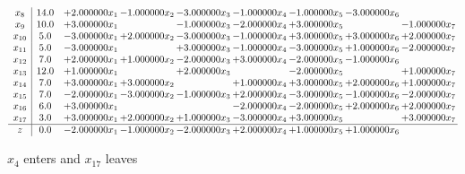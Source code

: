 \documentclass[10pt]{article}
\begin{document}
\[\begin{array}{c| c c@{\hskip 2pt} c@{\hskip 2pt} c@{\hskip 2pt} c@{\hskip 2pt} c@{\hskip 2pt} c@{\hskip 2pt} c@{\hskip 2pt} }
 x_{8}   &  14.0 & + 2.000000 x_{1} & -1.000000 x_{2} & -3.000000 x_{3} & -1.000000 x_{4} & -1.000000 x_{5} & -3.000000 x_{6} &   \\
 x_{9}   &  10.0 & + 3.000000 x_{1} &   & -1.000000 x_{3} & -2.000000 x_{4} & + 3.000000 x_{5} &   & -1.000000 x_{7}\\
 x_{10}   &  5.0 & -3.000000 x_{1} & + 2.000000 x_{2} & -3.000000 x_{3} & -1.000000 x_{4} & + 3.000000 x_{5} & + 3.000000 x_{6} & + 2.000000 x_{7}\\
 x_{11}   &  5.0 & -3.000000 x_{1} &   & + 3.000000 x_{3} & -1.000000 x_{4} & -3.000000 x_{5} & + 1.000000 x_{6} & -2.000000 x_{7}\\
 x_{12}   &  7.0 & + 2.000000 x_{1} & + 1.000000 x_{2} & -2.000000 x_{3} & + 3.000000 x_{4} & -2.000000 x_{5} & -1.000000 x_{6} &   \\
 x_{13}   &  12.0 & + 1.000000 x_{1} &   & + 2.000000 x_{3} &   & -2.000000 x_{5} &   & + 1.000000 x_{7}\\
 x_{14}   &  7.0 & + 3.000000 x_{1} & + 3.000000 x_{2} &   & + 1.000000 x_{4} & + 3.000000 x_{5} & + 2.000000 x_{6} & + 1.000000 x_{7}\\
 x_{15}   &  7.0 & -2.000000 x_{1} & -3.000000 x_{2} & -1.000000 x_{3} & + 2.000000 x_{4} & -3.000000 x_{5} & -1.000000 x_{6} & -2.000000 x_{7}\\
 x_{16}   &  6.0 & + 3.000000 x_{1} &    &   & -2.000000 x_{4} & -2.000000 x_{5} & + 2.000000 x_{6} & + 2.000000 x_{7}\\
 x_{17}   &  3.0 & + 3.000000 x_{1} & + 2.000000 x_{2} & + 1.000000 x_{3} & -3.000000 x_{4} & + 3.000000 x_{5} &   & + 3.000000 x_{7}\\
\hline
z    &  0.0 & -2.000000 x_{1} & -1.000000 x_{2} & -2.000000 x_{3} & + 2.000000 x_{4} & + 1.000000 x_{5} & + 1.000000 x_{6} &   \\
\end{array}\]


 $ x_{4} $ enters and $ x_{17} $ leaves 
\end{document}
